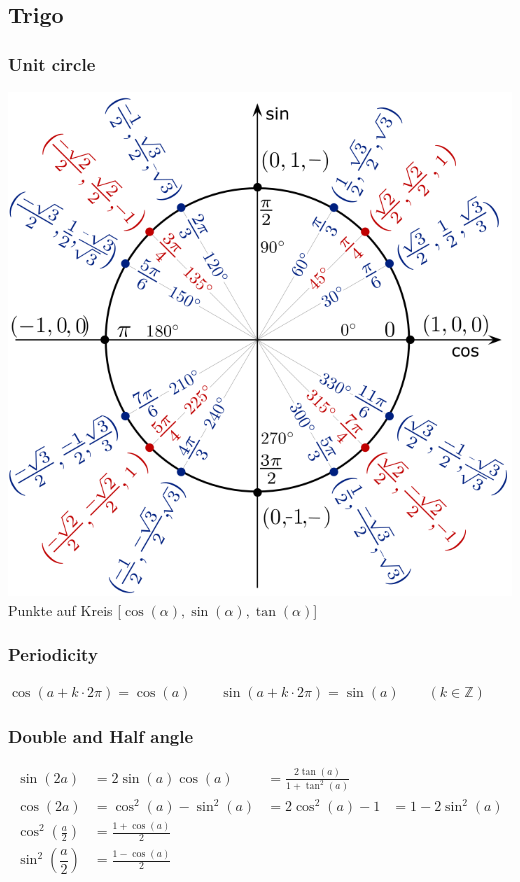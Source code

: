 \subsection{Trigo}
\subsubsection{Unit circle}
\begin{center}
	\includegraphics[width=0.8\columnwidth]{Images/einheitskreis}\\
	Punkte auf Kreis [$\cos(\alpha), \sin(\alpha), \tan(\alpha)$]
\end{center}

\subsubsection{Periodicity}
$\cos(a+k\cdot2\pi)=\cos(a) \qquad \sin(a+k\cdot2\pi)=\sin(a) \qquad
(k \in \mathbb{Z})$

\subsubsection{Double and Half angle}	
\begin{align*}
	\sin(2a) &=2\sin(a)\cos(a) &= \frac{2\tan(a)}{1 +\tan^2(a)}\\
	\cos(2a) &=\cos^2(a)-\sin^2(a) &= 2\cos^2(a)-1 &= 1-2\sin^2(a)\\
	\cos^2 \left(\frac{a}{2}\right) &=\frac{1+\cos(a)}{2} \\
	\sin^2 \left(\dfrac{a}{2}\right)&=\frac{1-\cos(a)}{2}
\end{align*}


